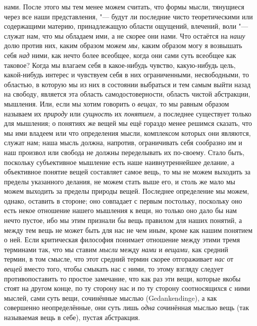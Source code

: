 нами. После этого мы тем менее можем считать, что формы мысли, тянущиеся через
все наши представления, "--- будут ли последние чисто теоретическими или
содержащими материю, принадлежащую области ощущений, влечений, воли "--- служат
нам, что мы обладаем ими, а не скорее они нами. Что остаётся на {\em нашу} долю
против них, каким образом можем {\em мы,} каким образом могу я возвышать себя
{\em над} ними, как нечто более всеобщее, когда они сами суть всеобщее как
таковое? Когда мы влагаем себя в какое-нибудь чувство, какую-нибудь цель,
какой-нибудь интерес и чувствуем себя в них ограниченными, несвободными, то
областью, в которую мы из них в состоянии выбраться и тем самым выйти назад на
свободу, является эта область самодостоверности, область чистой абстракции,
мышления. Или, если мы хотим говорить о {\em вещах,} то мы равным образом
называем их {\em природу} или {\em сущность} их {\em понятием,} а последнее
существует только для мышления; о понятиях же вещей мы ещё гораздо менее
решимся сказать, что мы ими владеем или что определения мысли, комплексом
которых они являются, служат нам; наша мысль должна, напротив, ограничивать
себя сообразно им и наш произвол или свобода не должны переделывать их
по-своему. Стало быть, поскольку субъективное мышление есть наше
наивнутреннейшее делание, а объективное понятие вещей составляет самое вещь, то
мы не можем выходить за пределы указанного делания, не можем стать выше его, и
столь же мало мы можем выходить за пределы природы вещей. Последнее определение
мы можем, однако, оставить в стороне; оно совпадает с первым постольку,
поскольку оно есть некое отношение нашего мышления к вещи, но только оно дало
бы нам нечто пустое, ибо мы этим признали бы вещь правилом для наших понятий, а
между тем вещь не может быть для нас не чем иным, кроме как нашим понятием о
ней. Если критическая философия понимает отношение между этими тремя терминами
так, что мы ставим {\em мысли} между {\em нами} и {\em вещами,} как средний
термин, в том смысле, что этот средний термин скорее отгораживает {\em нас} от
{\em вещей} вместо того, чтобы смыкать нас с ними, то этому взгляду следует
противопоставить то простое замечание, что как раз эти вещи, которые якобы
стоят на другом конце, по ту сторону нас и по ту сторону соотносящихся с ними
мыслей, сами суть вещи, сочинённые мыслью (Gedank\-end\-inge), а как совершенно
неопределённые, они суть лишь {\em одна} сочинённая мыслью вещь (так называемая
вещь в себе), пустая абстракция.

